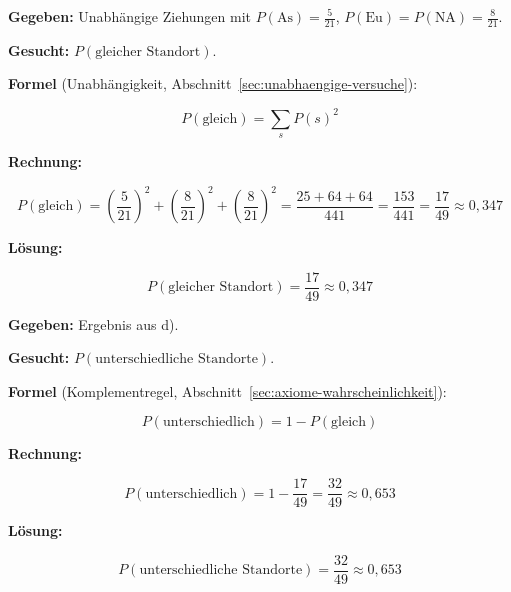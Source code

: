 \begin{beispiel}

\textbf{Gegeben:} Unabhängige Ziehungen mit $P(\text{As})=\tfrac{5}{21}$,
$P(\text{Eu})=P(\text{NA})=\tfrac{8}{21}$.

\textbf{Gesucht:} $P(\text{gleicher Standort})$.

\textbf{Formel} (Unabhängigkeit, Abschnitt~\ref{sec:unabhaengige-versuche}):

$$
P(\text{gleich}) = \sum_{s} P(s)^{2}
$$

\textbf{Rechnung:}

$$
P(\text{gleich}) = \left(\frac{5}{21}\right)^{2} + \left(\frac{8}{21}\right)^{2}
+ \left(\frac{8}{21}\right)^{2}
= \frac{25+64+64}{441} = \frac{153}{441} = \frac{17}{49} \approx 0{,}347
$$

\textbf{Lösung:}

$$
\boxed{P(\text{gleicher Standort}) = \frac{17}{49} \approx 0{,}347}
$$

\end{beispiel}

\begin{beispiel}

\textbf{Gegeben:} Ergebnis aus d).

\textbf{Gesucht:} $P(\text{unterschiedliche Standorte})$.

\textbf{Formel} (Komplementregel, Abschnitt~\ref{sec:axiome-wahrscheinlichkeit}):

$$
P(\text{unterschiedlich}) = 1 - P(\text{gleich})
$$

\textbf{Rechnung:}

$$
P(\text{unterschiedlich}) = 1 - \frac{17}{49} = \frac{32}{49} \approx 0{,}653
$$

\textbf{Lösung:}

$$
\boxed{P(\text{unterschiedliche Standorte}) = \frac{32}{49} \approx 0{,}653}
$$

\end{beispiel}
